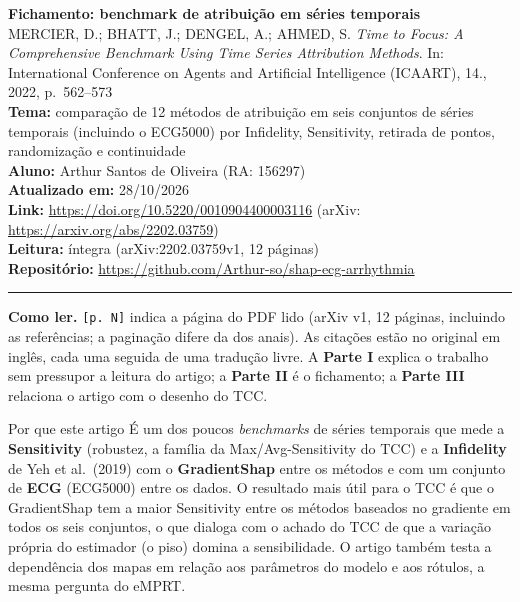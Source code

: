 \documentclass[11pt,a4paper]{article}
\begin{document}
\sloppy

\begin{center}
    {\LARGE \textbf{Fichamento: benchmark de atribuição em séries temporais}} \\[0.35em]
    {\large MERCIER, D.; BHATT, J.; DENGEL, A.; AHMED, S. \textit{Time to Focus: A Comprehensive Benchmark Using Time Series Attribution Methods}. In: International Conference on Agents and Artificial Intelligence (ICAART), 14., 2022, p.~562--573} \\[0.3em]
    \textbf{Tema:} comparação de 12 métodos de atribuição em seis conjuntos de séries temporais (incluindo o ECG5000) por Infidelity, Sensitivity, retirada de pontos, randomização e continuidade \\[0.2em]
    \textbf{Aluno:} Arthur Santos de Oliveira (RA: 156297) \\[0.2em]
    \textbf{Atualizado em:} 28/10/2026 \\[0.2em]
    \textbf{Link:} \url{https://doi.org/10.5220/0010904400003116} (arXiv: \url{https://arxiv.org/abs/2202.03759}) \\[0.2em]
    \textbf{Leitura:} íntegra (arXiv:2202.03759v1, 12 páginas) \\[0.2em]
    \textbf{Repositório:} \url{https://github.com/Arthur-so/shap-ecg-arrhythmia}
\end{center}
\vspace{-0.5em}
\hrule
\vspace{0.8em}

\textbf{Como ler.} \texttt{[p. N]} indica a página do PDF lido (arXiv v1, 12 páginas, incluindo as referências; a paginação difere da dos anais). As citações estão no original em inglês, cada uma seguida de uma tradução livre. A \textbf{Parte I} explica o trabalho sem pressupor a leitura do artigo; a \textbf{Parte II} é o fichamento; a \textbf{Parte III} relaciona o artigo com o desenho do TCC.

\begin{infobox}[note]{Por que este artigo}
É um dos poucos \textit{benchmarks} de séries temporais que mede a \textbf{Sensitivity} (robustez, a família da Max/Avg-Sensitivity do TCC) e a \textbf{Infidelity} de Yeh et al.\ (2019) com o \textbf{GradientShap} entre os métodos e com um conjunto de \textbf{ECG} (ECG5000) entre os dados. O resultado mais útil para o TCC é que o GradientShap tem a maior Sensitivity entre os métodos baseados no gradiente em todos os seis conjuntos, o que dialoga com o achado do TCC de que a variação própria do estimador (o piso) domina a sensibilidade. O artigo também testa a dependência dos mapas em relação aos parâmetros do modelo e aos rótulos, a mesma pergunta do eMPRT.
\end{infobox}
\end{document}
